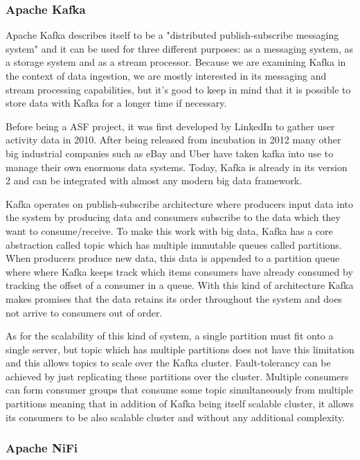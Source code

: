 \subsubsection{Apache Kafka}

Apache Kafka describes itself to be a "distributed publish-subscribe messaging system" and it can be used for three different purposes: as a messaging system, as a storage system and as a stream processor. \cite{kafka}
Because we are examining Kafka in the context of data ingestion, we are mostly interested in its messaging and stream processing capabilities, but it's good to keep in mind that it is possible to store data with Kafka for a longer time if necessary.

Before being a ASF project, it was first developed by LinkedIn to gather user activity data in 2010. \cite{ramalingeswara}
After being released from incubation in 2012 many other big industrial companies such as eBay and Uber \cite{yuan} have taken kafka into use to manage their own enormous data systems.
Today, Kafka is already in its version 2 and can be integrated with almost any modern big data framework. \cite{ramalingeswara}

Kafka operates on publish-subscribe architecture where producers input data into the system by producing data and consumers subscribe to the data which they want to consume/receive.
To make this work with big data, Kafka has a core abstraction called topic which has multiple immutable queues called partitions.
When producers produce new data, this data is appended to a partition queue where where Kafka keeps track which items consumers have already consumed by tracking the offset of a consumer in a queue.
With this kind of architecture Kafka makes promises that the data retains its order throughout the system and does not arrive to consumers out of order.

As for the scalability of this kind of system, a single partition must fit onto a single server, but topic which has multiple partitions does not have this limitation and this allows topics to scale over the Kafka cluster.
Fault-tolerancy can be achieved by just replicating these partitions over the cluster.
Multiple consumers can form consumer groups that consume some topic simultaneously from multiple partitions meaning that in addition of Kafka being itself scalable cluster, it allows its consumers to be also scalable cluster and without any additional complexity. \cite{kafka}

\subsubsection{Apache NiFi}

